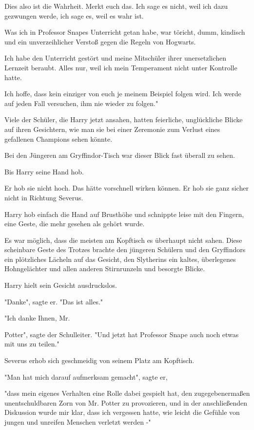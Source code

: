 {Dies also ist die Wahrheit. Merkt euch das. Ich sage es nicht, weil ich dazu gezwungen werde, ich sage es, weil es wahr ist.

Was ich in Professor Snapes Unterricht getan habe, war töricht, dumm, kindisch und ein unverzeihlicher Verstoß gegen die Regeln von Hogwarts.

Ich habe den Unterricht gestört und meine Mitschüler ihrer unersetzlichen Lernzeit beraubt. Alles nur, weil ich mein Temperament nicht unter Kontrolle hatte.

Ich hoffe, dass kein einziger von euch je meinem Beispiel folgen wird. Ich werde auf jeden Fall versuchen, ihm nie wieder zu folgen."

Viele der Schüler, die Harry jetzt ansahen, hatten feierliche, unglückliche Blicke auf ihren Gesichtern, wie man sie bei einer Zeremonie zum Verlust eines gefallenen Champions sehen könnte.

Bei den Jüngeren am Gryffindor-Tisch war dieser Blick fast überall zu sehen.

Bis Harry seine Hand hob.

Er hob sie nicht hoch. Das hätte vorschnell wirken können. Er hob sie ganz sicher nicht in Richtung Severus.

Harry hob einfach die Hand auf Brusthöhe und schnippte leise mit den Fingern, eine Geste, die mehr gesehen als gehört wurde.

Es war möglich, dass die meisten am Kopftisch es überhaupt nicht sahen. Diese scheinbare Geste des Trotzes brachte den jüngeren Schülern und den Gryffindors ein plötzliches Lächeln auf das Gesicht, den Slytherins ein kaltes, überlegenes Hohngelächter und allen anderen Stirnrunzeln und besorgte Blicke.

Harry hielt sein Gesicht ausdruckslos.

"Danke", sagte er. "Das ist alles."

"Ich danke Ihnen, Mr.

Potter", sagte der Schulleiter. "Und jetzt hat Professor Snape auch noch etwas mit uns zu teilen."

Severus erhob sich geschmeidig von seinem Platz am Kopftisch.

"Man hat mich darauf aufmerksam gemacht", sagte er,

"dass mein eigenes Verhalten eine Rolle dabei gespielt hat, den zugegebenermaßen unentschuldbaren Zorn von Mr. Potter zu provozieren, und in der anschließenden Diskussion wurde mir klar, dass ich vergessen hatte, wie leicht die Gefühle von jungen und unreifen Menschen verletzt werden -"

}

